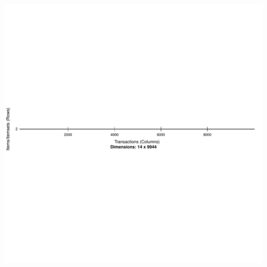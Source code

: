 \documentclass [a4paper] {article}
\begin{document}
\includegraphics{Practica2-candEclat}
\end{document}
